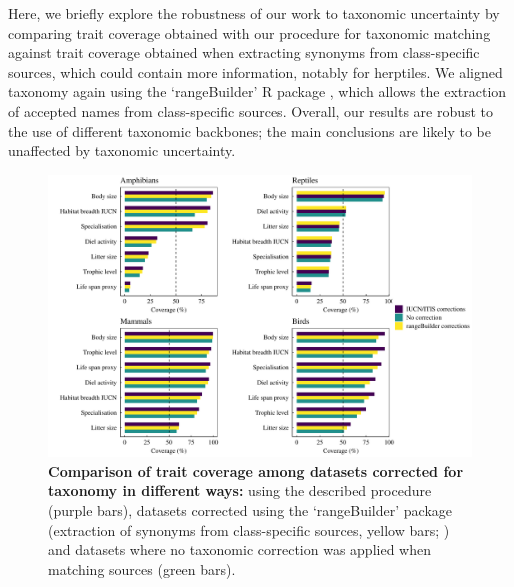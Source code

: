 Here, we briefly explore the robustness of our work to taxonomic uncertainty by comparing trait coverage obtained with our procedure for taxonomic matching against trait coverage obtained when extracting synonyms from class-specific sources, which could contain more information, notably for herptiles. We aligned taxonomy again using the `rangeBuilder' R package \citep{RangeBuilder}, which allows the extraction of accepted names from class-specific sources. Overall, our results are robust to the use of different taxonomic backbones; the main conclusions are likely to be unaffected by taxonomic uncertainty.

\begin{figure}[h!]
\centering
\includegraphics[scale=0.6]{Supporting/Chapter2/Figures/Coverage/DeltaCov_F3}
\caption[Comparison of trait coverage among datasets corrected for taxonomy in different ways]{\textbf{Comparison of trait coverage among datasets corrected for taxonomy in different ways:} using the described procedure (purple bars), datasets corrected using the `rangeBuilder' package (extraction of synonyms from class-specific sources, yellow bars; \citet{RangeBuilder}) and datasets where no taxonomic correction was applied when matching sources (green bars).}
\label{SI2_taxcor_rangebuilder}
\end{figure}